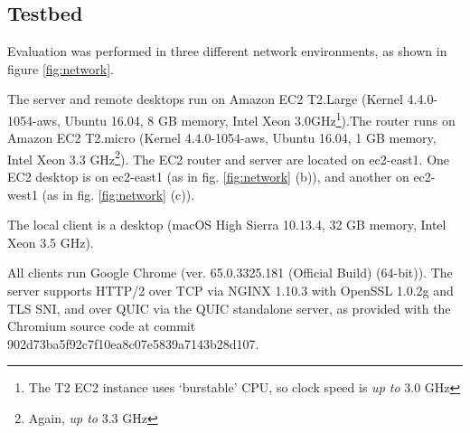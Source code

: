 \documentclass[12pt]{article}
\begin{document}
\subsection{Testbed}
Evaluation was performed in three different network environments, as shown in figure \ref{fig:network}.

The server and remote desktops run on Amazon EC2 T2.Large (Kernel 4.4.0-1054-aws, Ubuntu 16.04, 8 GB memory, Intel Xeon 3.0GHz\footnote{The T2 EC2 instance uses `burstable' CPU, so clock speed is \emph{up to} 3.0 GHz}).The router runs on Amazon EC2 T2.micro (Kernel 4.4.0-1054-aws, Ubuntu 16.04, 1 GB memory, Intel Xeon 3.3 GHz\footnote{Again, \emph{up to} 3.3 GHz}). The EC2 router and server are located on ec2-east1. One EC2 desktop is on ec2-east1 (as in fig. \ref{fig:network} (b)), and another on ec2-west1 (as in fig. \ref{fig:network} (c)).

The local client is a desktop (macOS High Sierra 10.13.4, 32 GB memory, Intel Xeon 3.5 GHz).

All clients run Google Chrome (ver. 65.0.3325.181 (Official Build) (64-bit)). The server supports HTTP/2 over TCP via NGINX 1.10.3 with OpenSSL 1.0.2g and TLS SNI, and over QUIC via the QUIC standalone server, as provided with the Chromium source code at commit\\
902d73ba5f92c7f10ea8c07e5839a7143b28d107.
\end{document}
